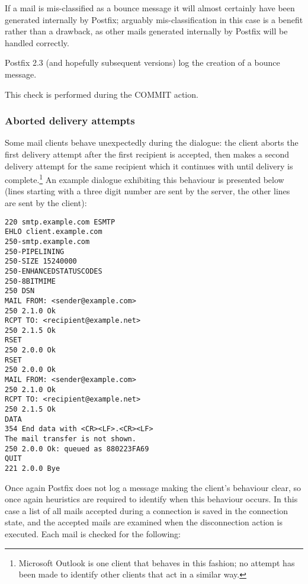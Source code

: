 If a mail is mis-classified as a bounce message it will almost certainly
have been generated internally by Postfix; arguably mis-classification in
this case is a benefit rather than a drawback, as other mails generated
internally by Postfix will be handled correctly.

Postfix 2.3 (and hopefully subsequent versions) log the creation of a
bounce message.

This check is performed during the COMMIT action.

\subsubsection{Aborted delivery attempts}

\label{aborted-delivery-attempts}

Some mail clients behave unexpectedly during the \SMTP{} dialogue: the
client aborts the first delivery attempt after the first recipient is
accepted, then makes a second delivery attempt for the same recipient which
it continues with until delivery is complete.\footnote{Microsoft Outlook is
one client that behaves in this fashion; no attempt has been made to
identify other clients that act in a similar way.}  An example dialogue
exhibiting this behaviour is presented below (lines starting with a three
digit number are sent by the server, the other lines are sent by the
client):

\begin{verbatim}
220 smtp.example.com ESMTP
EHLO client.example.com
250-smtp.example.com
250-PIPELINING
250-SIZE 15240000
250-ENHANCEDSTATUSCODES
250-8BITMIME
250 DSN
MAIL FROM: <sender@example.com>
250 2.1.0 Ok
RCPT TO: <recipient@example.net>
250 2.1.5 Ok
RSET
250 2.0.0 Ok
RSET
250 2.0.0 Ok
MAIL FROM: <sender@example.com>
250 2.1.0 Ok
RCPT TO: <recipient@example.net>
250 2.1.5 Ok
DATA
354 End data with <CR><LF>.<CR><LF>
The mail transfer is not shown.
250 2.0.0 Ok: queued as 880223FA69
QUIT
221 2.0.0 Bye
\end{verbatim}

Once again Postfix does not log a message making the client's behaviour
clear, so once again heuristics are required to identify when this
behaviour occurs.  In this case a list of all mails accepted during a
connection is saved in the connection state, and the accepted mails are
examined when the disconnection action is executed.  Each mail is checked
for the following: 

